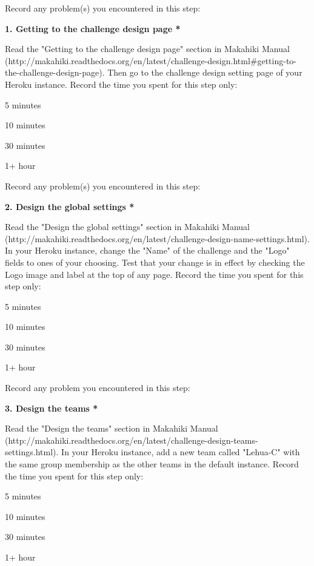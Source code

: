 Record any problem(s) you encountered in this step:

{\bf 1. Getting to the challenge design page *}

Read the "Getting to the challenge design page" section in Makahiki Manual (http://makahiki.readthedocs.org/en/latest/challenge-design.html\#getting-to-the-challenge-design-page). Then go to the challenge design setting page of your Heroku instance. Record the time you spent for this step only:

\begin{compactitem}
\item 5 minutes
\item  10 minutes
\item  30 minutes
\item  1+ hour
\end{compactitem}

Record any problem(s) you encountered in this step:

{\bf 2. Design the global settings *}

Read the "Design the global settings" section in Makahiki Manual (http://makahiki.readthedocs.org/en/latest/challenge-design-name-settings.html). In your Heroku instance, change the "Name" of the challenge and the "Logo" fields to ones of your choosing. Test that your change is in effect by checking the Logo image and label at the top of any page. Record the time you spent for this step only:

\begin{compactitem}
\item 5 minutes
\item  10 minutes
\item  30 minutes
\item  1+ hour
\end{compactitem}


Record any problem you encountered in this step:

{\bf 3. Design the teams *}

Read the "Design the teams" section in Makahiki Manual (http://makahiki.readthedocs.org/en/latest/challenge-design-teams-settings.html). In your Heroku instance, add a new team called "Lehua-C" with the same group membership as the other teams in the default instance. Record the time you spent for this step only:

\begin{compactitem}
\item 5 minutes
\item  10 minutes
\item  30 minutes
\item  1+ hour
\end{compactitem}


